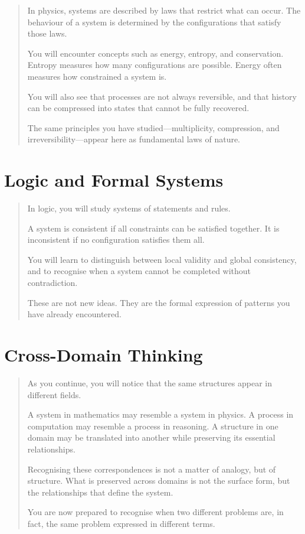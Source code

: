 \documentclass[11pt]{book}
\theoremstyle{plain}
\theoremstyle{definition}
\theoremstyle{remark}
\begin{document}
\begin{quote}
In physics, systems are described by laws that restrict what can occur.
The behaviour of a system is determined by the configurations that
satisfy those laws.

You will encounter concepts such as energy, entropy, and conservation.
Entropy measures how many configurations are possible. Energy often
measures how constrained a system is.

You will also see that processes are not always reversible, and that
history can be compressed into states that cannot be fully recovered.

The same principles you have studied---multiplicity, compression, and
irreversibility---appear here as fundamental laws of nature.
\end{quote}

\section*{Logic and Formal Systems}

\begin{quote}
In logic, you will study systems of statements and rules.

A system is consistent if all constraints can be satisfied together.
It is inconsistent if no configuration satisfies them all.

You will learn to distinguish between local validity and global
consistency, and to recognise when a system cannot be completed without
contradiction.

These are not new ideas. They are the formal expression of patterns you
have already encountered.
\end{quote}

\section*{Cross-Domain Thinking}

\begin{quote}
As you continue, you will notice that the same structures appear in
different fields.

A system in mathematics may resemble a system in physics. A process in
computation may resemble a process in reasoning. A structure in one
domain may be translated into another while preserving its essential
relationships.

Recognising these correspondences is not a matter of analogy, but of
structure. What is preserved across domains is not the surface form,
but the relationships that define the system.

You are now prepared to recognise when two different problems are, in
fact, the same problem expressed in different terms.
\end{quote}
\end{document}
